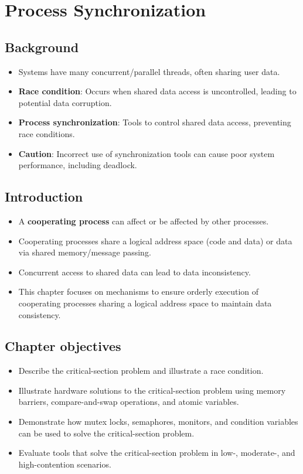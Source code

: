 \section{Process Synchronization}\label{sec:6.1}

\subsection{Background}
\begin{itemize}
    \item Systems have many concurrent/parallel threads, often sharing user data.
    \item \textbf{Race condition}: Occurs when shared data access is uncontrolled, leading to potential data corruption.
    \item \textbf{Process synchronization}: Tools to control shared data access, preventing race conditions.
    \item \textbf{Caution}: Incorrect use of synchronization tools can cause poor system performance, including deadlock.
\end{itemize}

\subsection{Introduction}
\begin{itemize}
    \item A \textbf{cooperating process} can affect or be affected by other processes.
    \item Cooperating processes share a logical address space (code and data) or data via shared memory/message passing.
    \item Concurrent access to shared data can lead to data inconsistency.
    \item This chapter focuses on mechanisms to ensure orderly execution of cooperating processes sharing a logical address space to maintain data consistency.
\end{itemize}

\subsection{Chapter objectives}
\begin{itemize}
    \item Describe the critical-section problem and illustrate a race condition.
    \item Illustrate hardware solutions to the critical-section problem using memory barriers, compare-and-swap operations, and atomic variables.
    \item Demonstrate how mutex locks, semaphores, monitors, and condition variables can be used to solve the critical-section problem.
    \item Evaluate tools that solve the critical-section problem in low-, moderate-, and high-contention scenarios.
\end{itemize}

